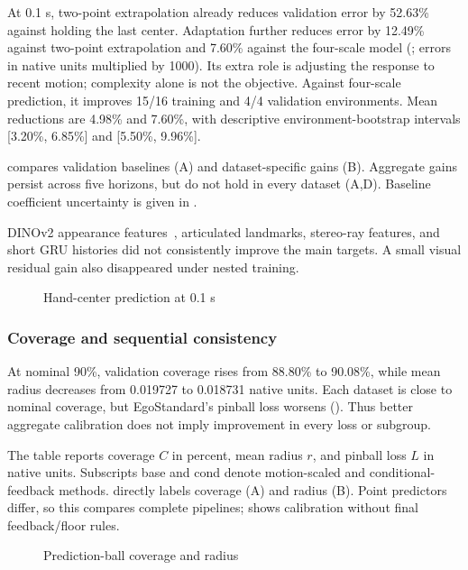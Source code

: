 At 0.1 s, two-point extrapolation already reduces validation error by 52.63\% against holding the last center. Adaptation further reduces error by 12.49\% against two-point extrapolation and 7.60\% against the four-scale model (; errors in native units multiplied by 1000). Its extra role is adjusting the response to recent motion; complexity alone is not the objective. Against four-scale prediction, it improves 15/16 training and 4/4 validation environments. Mean reductions are 4.98\% and 7.60\%, with descriptive environment-bootstrap intervals [3.20\%, 6.85\%] and [5.50\%, 9.96\%].


 compares validation baselines (A) and dataset-specific gains (B). Aggregate gains persist across five horizons, but do not hold in every dataset (A,D). Baseline coefficient uncertainty is given in .

DINOv2 appearance features~\cite{dinov2}, articulated landmarks, stereo-ray features, and short GRU histories did not consistently improve the main targets. A small visual residual gain also disappeared under nested training.
\begin{figure}[!htbp]
\centering
{}
\caption{Hand-center prediction at 0.1 s}
\label{fig:point}
\end{figure}
\FloatBarrier

\subsubsection{Coverage and sequential consistency}
At nominal 90\%, validation coverage rises from 88.80\% to 90.08\%, while mean radius decreases from 0.019727 to 0.018731 native units. Each dataset is close to nominal coverage, but EgoStandard's pinball loss worsens (). Thus better aggregate calibration does not imply improvement in every loss or subgroup.

The table reports coverage $C$ in percent, mean radius $r$, and pinball loss $L$ in native units. Subscripts base and cond denote motion-scaled and conditional-feedback methods.  directly labels coverage (A) and radius (B). Point predictors differ, so this compares complete pipelines;  shows calibration without final feedback/floor rules.

\begin{figure}[!htbp]
\centering
{}
\caption{Prediction-ball coverage and radius}
\label{fig:coverage}
\end{figure}

